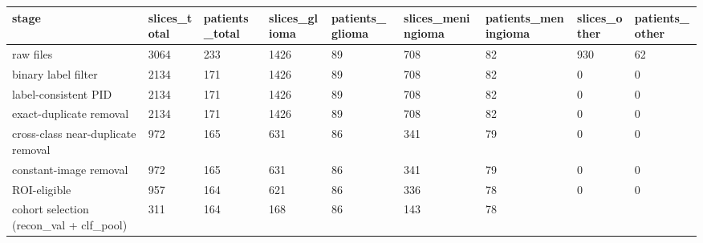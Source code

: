 \begin{tabular}{lllllllll}
\hline
stage & slices\_total & patients\_total & slices\_glioma & patients\_glioma & slices\_meningioma & patients\_meningioma & slices\_other & patients\_other \\
\hline
raw files & 3064 & 233 & 1426 & 89 & 708 & 82 & 930 & 62 \\
binary label filter & 2134 & 171 & 1426 & 89 & 708 & 82 & 0 & 0 \\
label-consistent PID & 2134 & 171 & 1426 & 89 & 708 & 82 & 0 & 0 \\
exact-duplicate removal & 2134 & 171 & 1426 & 89 & 708 & 82 & 0 & 0 \\
cross-class near-duplicate removal & 972 & 165 & 631 & 86 & 341 & 79 & 0 & 0 \\
constant-image removal & 972 & 165 & 631 & 86 & 341 & 79 & 0 & 0 \\
ROI-eligible & 957 & 164 & 621 & 86 & 336 & 78 & 0 & 0 \\
cohort selection (recon\_val + clf\_pool) & 311 & 164 & 168 & 86 & 143 & 78 &  &  \\
\hline
\end{tabular}
